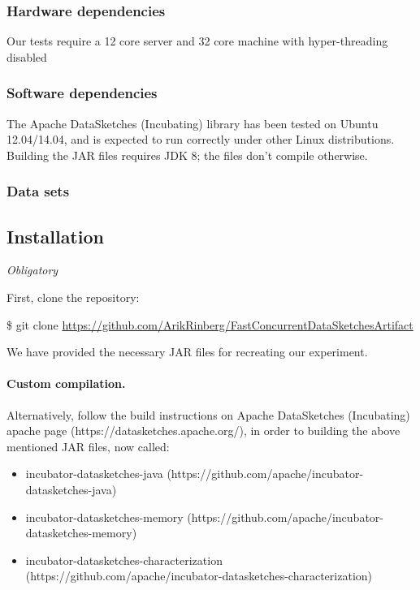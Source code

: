 \documentclass{sigplanconf}
\begin{document}
{\subsubsection{Hardware dependencies}
Our tests require a 12 core server and 32 core machine with hyper-threading disabled

\subsubsection{Software dependencies}
The Apache DataSketches (Incubating) library has been tested on Ubuntu 12.04/14.04,
and is expected to run correctly under other Linux distributions. Building the JAR
files requires JDK 8; the files don't compile otherwise.

\subsubsection{Data sets}

\subsection{Installation}

{\em Obligatory}

First, clone the repository:

\begin{framed}

\$ git clone \url{https://github.com/ArikRinberg/FastConcurrentDataSketchesArtifact}

\end{framed}

\noindent We have provided the necessary JAR files for recreating our experiment.

\paragraph{\textbf{Custom compilation.}} 
Alternatively, follow the build instructions on Apache DataSketches (Incubating) apache
page (https://datasketches.apache.org/), in order to building the above mentioned
JAR files, now called:
\begin{itemize}
  \item incubator-datasketches-java (https://github.com/apache/incubator-datasketches-java)
  \item incubator-datasketches-memory (https://github.com/apache/incubator-datasketches-memory)
  \item incubator-datasketches-characterization (https://github.com/apache/incubator-datasketches-characterization)
\end{itemize}

}
\end{document}
